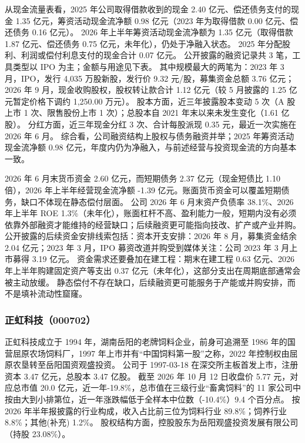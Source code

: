 从现金流量表看，2025 年公司取得借款收到的现金 2.40 亿元、偿还债务支付的现金 1.35 亿元，筹资活动现金流净额 0.98 亿元（2023 年为取得借款 0.00 亿元、偿还债务 0.16 亿元）。 2026 年上半年筹资活动现金流净额为 1.35 亿元（取得借款 1.87 亿元、偿还债务 0.75 亿元，未年化），仍处于净融入状态。 2025 年分配股利、利润或偿付利息支付的现金合计 0.07 亿元。 公开披露的融资记录共 3 笔，工具类型以 IPO 为主；金额与用途见下表。 其中规模最大的两笔为：2023 年 3 月，IPO，发行 4,035 万股新股，发行价 9.32 元/股，募集资金总额 3.76 亿元；2026 年 9 月，现金收购股权，股权转让款合计 1.12 亿元（较 5 月披露的 1.25 亿元暂定价格下调约 1,250.00 万元）。 股本方面，近三年披露股本变动 5 次（A 股上市 1 次、限售股份上市 1 次）；总股本自 2021 年末以来未发生变化（1.61 亿股）。 分红方面，近三年现金分红 3 次、合计每股派现 0.35 元，最近一次实施在 2026 年 6 月。 综合看，公司融资结构上股权与债务融资并举；2025 年筹资活动现金流净额 0.98 亿元，年度内仍为净融入，与前述经营与投资现金流的方向基本一致。

 2026 年 6 月末货币资金 2.60 亿元，而短期债务 2.37 亿元（现金短债比 1.10 倍），2026 年上半年经营现金流净额 -1.39 亿元。账面货币资金可以覆盖短期债务，缺口不体现在静态偿付层面。 公司 2026 年 6 月末资产负债率 38.1\%、2026 年上半年 ROE 1.3\%（未年化），账面杠杆不高、盈利能力一般，短期内没有必须依靠外部融资才能维持的经营缺口；后续融资更可能指向技改、扩产或产业并购。 公开披露的后续资金安排线索包括：资本开支安排：2026 年 8 月，募集资金结余 2.04 亿元；2023 年 3 月，IPO 募资改道并购受到媒体关注：公司 2023 年 3 月上市募得 3.19 亿元。 资金需求还要叠加在建工程：期末在建工程 0.63 亿元、2026 年上半年购建固定资产等支出 0.37 亿元（未年化），这部分支出在周期底部通常会被主动放缓。 静态偿付不存在缺口，后续融资更可能服务于产能或并购安排，而不是填补流动性窟窿。




\subsubsection{正虹科技（000702）}
\label{co:000702}

 正虹科技成立于 1994 年，湖南岳阳的老牌饲料企业，前身可追溯至 1986 年的国营屈原农场饲料厂，1997 年上市并有“中国饲料第一股”之称，2022 年控制权由屈原农垦转至岳阳国资观盛投资。 公司于 1997-03-18 在深交所主板首发上市，注册资本 3.47 亿元，总股本 3.47 亿股。 截至 2026 年 10 月 12 日收盘价 5.77 元，对应总市值 20.0 亿元，近一年-19.8\%，总市值在三级行业“畜禽饲料”的 11 家公司中按由大到小排第位，近一年涨跌幅低于全样本中位数（-10.4\%）9.4 个百分点。 按 2026 年半年报披露的行业构成，收入占比前三位为饲料行业 89.8\%；饲养行业 8.8\%；其他(补充) 1.2\%。 股权结构方面，控股股东为岳阳观盛投资发展有限公司（持股 23.08\%）。

